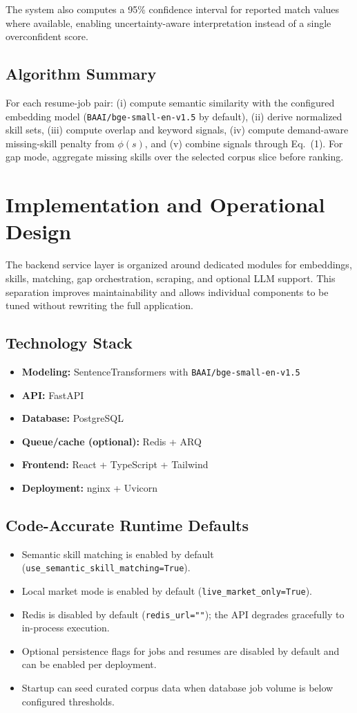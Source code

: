 \documentclass[conference]{IEEEtran}
\begin{document}
The system also computes a 95\% confidence interval for reported match values where available, enabling uncertainty-aware interpretation instead of a single overconfident score.

\subsection{Algorithm Summary}
For each resume-job pair: (i) compute semantic similarity with the configured embedding model (\texttt{BAAI/bge-small-en-v1.5} by default), (ii) derive normalized skill sets, (iii) compute overlap and keyword signals, (iv) compute demand-aware missing-skill penalty from $\phi(s)$, and (v) combine signals through Eq.~(1). For gap mode, aggregate missing skills over the selected corpus slice before ranking.

\section{Implementation and Operational Design}
The backend service layer is organized around dedicated modules for embeddings, skills, matching, gap orchestration, scraping, and optional LLM support. This separation improves maintainability and allows individual components to be tuned without rewriting the full application.

\subsection{Technology Stack}
\begin{itemize}
    \item \textbf{Modeling:} SentenceTransformers with \texttt{BAAI/bge-small-en-v1.5}
    \item \textbf{API:} FastAPI
    \item \textbf{Database:} PostgreSQL
    \item \textbf{Queue/cache (optional):} Redis + ARQ
    \item \textbf{Frontend:} React + TypeScript + Tailwind
    \item \textbf{Deployment:} nginx + Uvicorn
\end{itemize}

\subsection{Code-Accurate Runtime Defaults}
\begin{itemize}
    \item Semantic skill matching is enabled by default (\texttt{use\_semantic\_skill\_matching=True}).
    \item Local market mode is enabled by default (\texttt{live\_market\_only=True}).
    \item Redis is disabled by default (\texttt{redis\_url=""}); the API degrades gracefully to in-process execution.
    \item Optional persistence flags for jobs and resumes are disabled by default and can be enabled per deployment.
    \item Startup can seed curated corpus data when database job volume is below configured thresholds.
\end{itemize}
\end{document}
